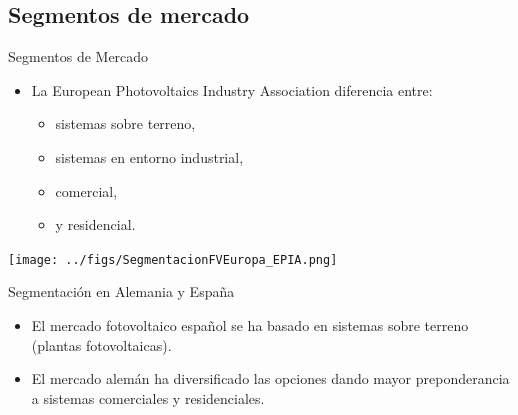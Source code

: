\documentclass[xcolor={usenames,svgnames,dvipsnames}]{beamer}
\begin{document}
\subsection{Segmentos de mercado}
\label{sec:org346def9}

\begin{frame}[label={sec:org8d30d23}]{Segmentos de Mercado}
\begin{itemize}
\item La European Photovoltaics Industry Association diferencia entre:
\begin{itemize}
\item sistemas sobre terreno,
\item sistemas en entorno industrial,
\item comercial,
\item y residencial.
\end{itemize}
\end{itemize}

\begin{center}
\texttt{[image: ../figs/SegmentacionFVEuropa\_EPIA.png]}
\end{center}
\end{frame}

\begin{frame}[label={sec:org153fdc3}]{Segmentación en Alemania y España}
\begin{itemize}
\item El mercado fotovoltaico español se ha basado en sistemas sobre
terreno (plantas fotovoltaicas).

\item El mercado alemán ha diversificado las opciones dando mayor
preponderancia a sistemas comerciales y residenciales.
\end{itemize}
\end{frame}
\end{document}

